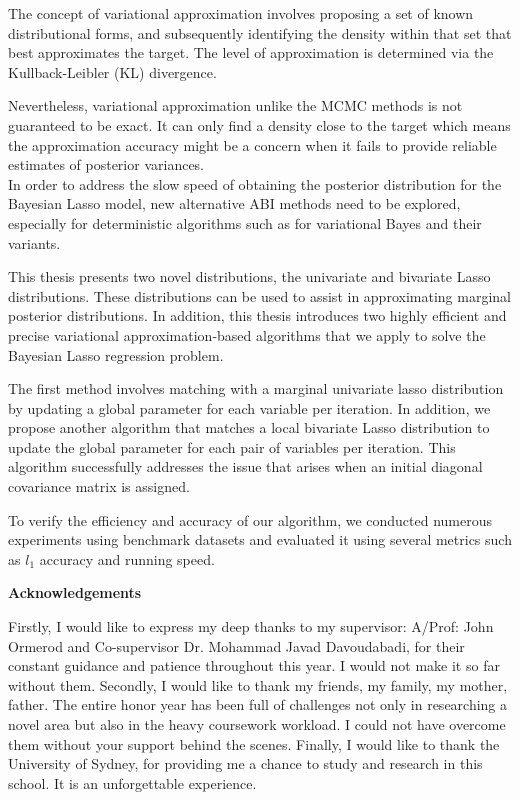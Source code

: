 The concept of variational approximation involves proposing a set of known distributional forms, and subsequently identifying the density within that set that best approximates the target. The level of approximation is determined  via the Kullback-Leibler (KL) divergence.

Nevertheless, variational approximation unlike the MCMC methods is  not guaranteed to be exact. It can only find a density close to the target which means the approximation accuracy might be a concern when it fails to provide reliable estimates of posterior variances.\\
In order to address the slow speed of obtaining the posterior distribution for the Bayesian Lasso model, new alternative ABI methods need to be explored, especially for deterministic algorithms such as for variational Bayes and their variants.

This thesis presents two novel distributions, the univariate and bivariate Lasso distributions. These distributions can be used to assist in approximating marginal posterior distributions. In addition, this thesis introduces two highly efficient and precise variational approximation-based algorithms that we apply to solve the Bayesian Lasso regression problem.

The first method involves matching with a marginal univariate lasso distribution by updating a global parameter for each variable per iteration. In addition, we propose another algorithm that matches a local bivariate Lasso distribution to update the global parameter for each pair of variables per iteration. This algorithm successfully addresses the issue that arises when an initial diagonal covariance matrix is assigned.

To verify the efficiency and accuracy of our algorithm, we conducted numerous experiments using benchmark datasets and evaluated it using several metrics such as $l_1$ accuracy and running speed.

\newpage

\begin{center}
    \textbf{\large Acknowledgements}\\
    \vspace{0.5cm}
\end{center}
	Firstly, I would like to express my deep thanks to my supervisor: A/Prof: John Ormerod and Co-supervisor Dr. Mohammad Javad Davoudabadi, for their constant guidance and patience throughout this year. I would not make it so far without them.
   Secondly, I would like to thank my friends, my family, my mother, father. The entire honor year has been full of challenges not only in researching a novel area but also in the heavy coursework workload. I could not have overcome them without your support behind the scenes.
    Finally, I would like to thank the University of Sydney, for providing me a chance to study and research in this school. It is an unforgettable experience.
\vfill
\hspace{0pt}
\pagebreak
\newpage